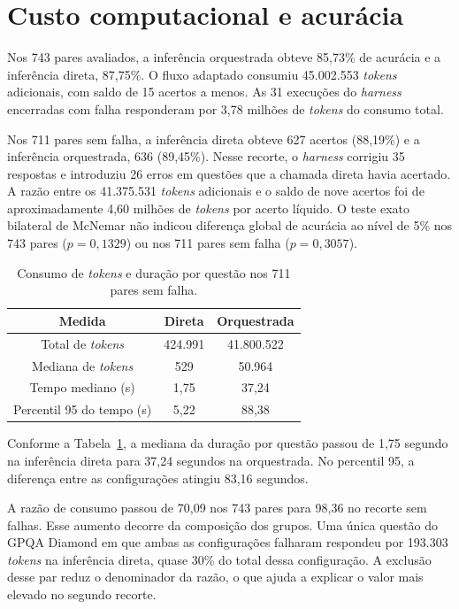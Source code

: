 \documentclass[a4paper,10pt, twocolumn]{article}
\begin{document}
\clearpage
\section{Custo computacional e acurácia}

Nos 743 pares avaliados, a inferência orquestrada obteve 85,73\% de acurácia e a inferência direta, 87,75\%. O fluxo adaptado consumiu 45.002.553 \textit{tokens} adicionais, com saldo de 15 acertos a menos. As 31 execuções do \textit{harness} encerradas com falha responderam por 3,78 milhões de \textit{tokens} do consumo total.

Nos 711 pares sem falha, a inferência direta obteve 627 acertos (88,19\%) e a inferência orquestrada, 636 (89,45\%). Nesse recorte, o \textit{harness} corrigiu 35 respostas e introduziu 26 erros em questões que a chamada direta havia acertado. A razão entre os 41.375.531 \textit{tokens} adicionais e o saldo de nove acertos foi de aproximadamente 4,60 milhões de \textit{tokens} por acerto líquido. O teste exato bilateral de McNemar não indicou diferença global de acurácia ao nível de 5\% nos 743 pares ($p=0{,}1329$) ou nos 711 pares sem falha ($p=0{,}3057$).

\begin{table}[H]
\caption{Consumo de \textit{tokens} e duração por questão nos 711 pares sem falha.}\label{tab:recursos}
\centering\small
\begin{tabular}{@{}ccc@{}}
\toprule
Medida & Direta & Orquestrada \\
\midrule
Total de \textit{tokens} & 424.991 & 41.800.522 \\
Mediana de \textit{tokens} & 529 & 50.964 \\
Tempo mediano (s) & 1,75 & 37,24 \\
Percentil 95 do tempo (s) & 5,22 & 88,38 \\
\bottomrule
\end{tabular}
\end{table}

Conforme a Tabela~\ref{tab:recursos}, a mediana da duração por questão passou de 1,75 segundo na inferência direta para 37,24 segundos na orquestrada. No percentil 95, a diferença entre as configurações atingiu 83,16 segundos.

A razão de consumo passou de 70,09 nos 743 pares para 98,36 no recorte sem falhas. Esse aumento decorre da composição dos grupos. Uma única questão do GPQA Diamond em que ambas as configurações falharam respondeu por 193.303 \textit{tokens} na inferência direta, quase 30\% do total dessa configuração. A exclusão desse par reduz o denominador da razão, o que ajuda a explicar o valor mais elevado no segundo recorte.
\end{document}
